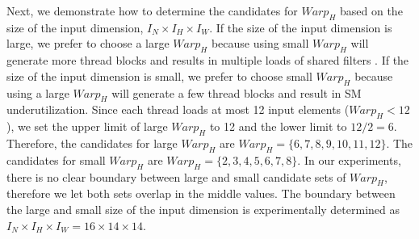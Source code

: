 Next, we demonstrate how to determine the candidates for $Warp_H$ based on the size of the input dimension, $I_N \times I_H \times I_W$.
If the size of the input dimension is large, we prefer to choose a large $Warp_H$ because using small $Warp_H$ will generate more thread blocks and results in multiple loads of shared filters \cite{jia2020enabling, zheng2020flextensor}.
If the size of the input dimension is small, we prefer to choose small $Warp_H$ because using a large $Warp_H$ will generate a few thread blocks and result in SM underutilization.
Since each thread loads at most 12 input elements ($Warp_H<12$), we set the upper limit of large $Warp_H$ to 12 and the lower limit to $12/2=6$.
Therefore, the candidates for large $Warp_H$ are $Warp_H=\{6,7,8,9,10,11,12\}$.
The candidates for small $Warp_H$ are $Warp_H=\{2,3,4,5,6,7,8\}$.
In our experiments, there is no clear boundary between large and small candidate sets of $Warp_H$, therefore we let both sets overlap in the middle values.
The boundary between the large and small size of the input dimension is experimentally determined as $I_N \times I_H \times I_W=16 \times 14 \times 14$.

